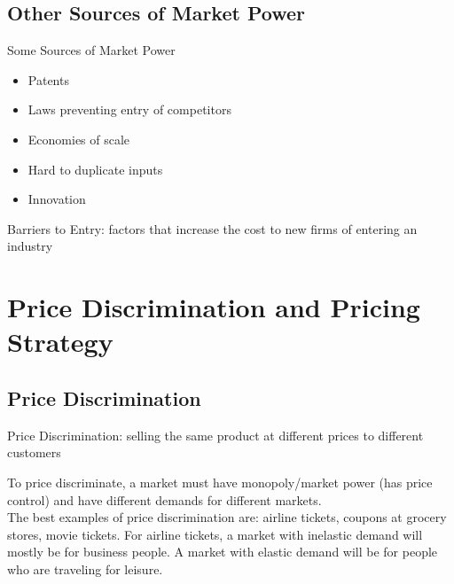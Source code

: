 \documentclass[12pt]{article}
\begin{document}
\subsection{Other Sources of Market Power}
Some Sources of Market Power \begin{itemize} 
\item Patents 
\item Laws preventing entry of competitors 
\item Economies of scale 
\item Hard to duplicate inputs 
\item Innovation \end{itemize}
\begin{definition} Barriers to Entry: factors that increase the cost to new firms of entering an industry \end{definition}


\section{Price Discrimination and Pricing Strategy}
\subsection{Price Discrimination}
\begin{definition} Price Discrimination: selling the same product at different prices to different customers \end{definition}
To price discriminate, a market must have monopoly/market power (has price control) and have different demands for different markets.\\
The best examples of price discrimination are: airline tickets, coupons at grocery stores, movie tickets. For airline tickets, a market with inelastic demand will mostly be for business people. A market with elastic demand will be for people who are traveling for leisure. 
\end{document}

